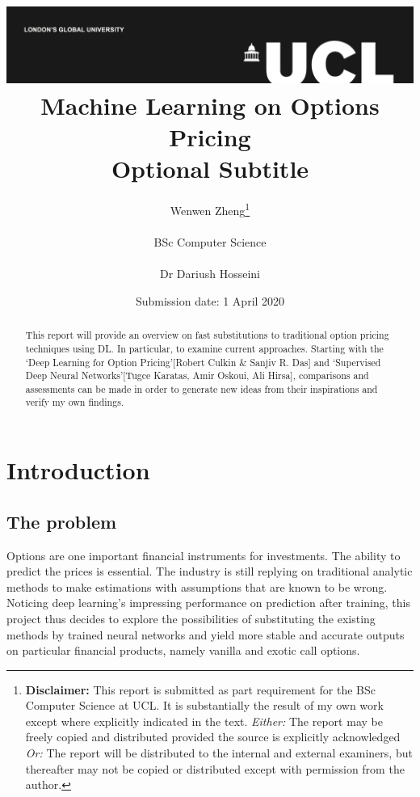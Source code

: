 \documentclass{report}
\title{{\vspace{-14em} \includegraphics[scale=0.4]{ucl_logo.png}}\\
{{\Huge Machine Learning on Options Pricing}}\\
{\large Optional Subtitle}\\
}
\date{Submission date: 1 April 2020}
\author{Wenwen Zheng\thanks{
{\bf Disclaimer:}
This report is submitted as part requirement for the BSc Computer Science at UCL. It is
substantially the result of my own work except where explicitly indicated in the text.
\emph{Either:} The report may be freely copied and distributed provided the source is explicitly acknowledged
\newline  
\emph{Or:}\newline
The report will be distributed to the internal and external examiners, but thereafter may not be copied or distributed except with permission from the author.}
\\ \\
BSc Computer Science\\ \\
Dr Dariush Hosseini }
\begin{document}
 
\onehalfspacing
\maketitle
\begin{abstract}
This report will provide an overview on fast substitutions to traditional option pricing techniques using DL. In particular, to examine current approaches. Starting with the ‘Deep Learning for Option Pricing’[Robert Culkin & Sanjiv R. Das] and ‘Supervised Deep Neural Networks’[Tugce Karatas, Amir Oskoui, Ali Hirsa], comparisons and assessments can be made in order to generate new ideas from their inspirations and verify my own findings. 

\end{abstract}
\tableofcontents
\setcounter{page}{1}


\chapter{Introduction}

\section{The problem}
Options are one important financial instruments for investments. The ability to predict the prices is essential. The industry is still replying on traditional analytic methods to make estimations with assumptions that are known to be wrong. Noticing deep learning's impressing performance on prediction after training, this project thus decides to explore the possibilities of substituting the existing methods by trained neural networks and yield more stable and accurate outputs on particular financial products, namely vanilla and exotic call options. 
\end{document}
